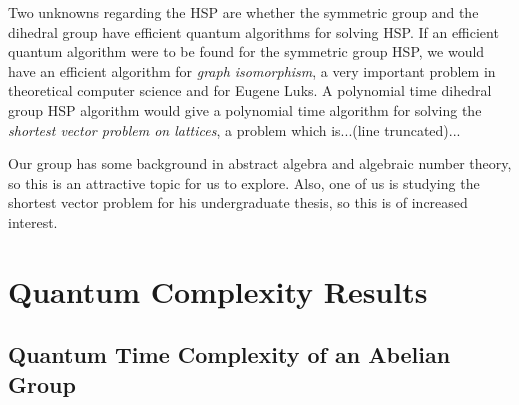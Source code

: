 \documentclass[12pt]{article}
\theoremstyle{plain}
\theoremstyle{definition}
\begin{document}
Two unknowns regarding the HSP are whether the symmetric group and the dihedral group have efficient quantum algorithms for solving HSP. If an efficient quantum algorithm were to be found for the symmetric group HSP, we would have an efficient algorithm for \emph{graph isomorphism}, a very important problem in theoretical computer science and for Eugene Luks. A polynomial time dihedral group HSP algorithm would give a polynomial time algorithm for solving the \emph{shortest vector problem on lattices}, a problem which is...(line truncated)...

Our group has some background in abstract algebra and algebraic number theory, so this is an attractive topic for us to explore. Also, one of us is studying the shortest vector problem for his undergraduate thesis, so this is of increased interest.\\
%

%
\section{Quantum Complexity Results}


\subsection{Quantum Time Complexity of an Abelian Group}
\end{document}

